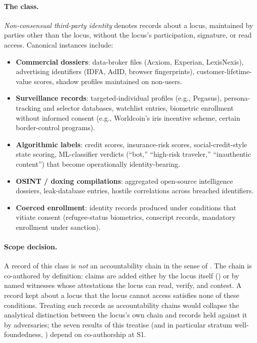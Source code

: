 \documentclass[11pt,a4paper,parskip=half-,DIV=12,headings=standardclasses]{scrartcl}
\theoremstyle{ncthm}
\theoremstyle{ncdef}
\begin{document}
\paragraph{The class.} \emph{Non-consensual third-party identity}
denotes records about a locus, maintained by parties other than the
locus, without the locus's participation, signature, or read access.
Canonical instances include:
\begin{itemize}
\item \textbf{Commercial dossiers}: data-broker files (Acxiom,
  Experian, LexisNexis), advertising identifiers (IDFA, AdID, browser
  fingerprints), customer-lifetime-value scores, shadow profiles
  maintained on non-users.
\item \textbf{Surveillance records}: targeted-individual profiles
  (e.g., Pegasus), persona-tracking and selector databases, watchlist
  entries, biometric enrollment without informed consent (e.g.,
  Worldcoin's iris incentive scheme, certain border-control programs).
\item \textbf{Algorithmic labels}: credit scores, insurance-risk
  scores, social-credit-style state scoring, ML-classifier verdicts
  (``bot,'' ``high-risk traveler,'' ``inauthentic content'') that
  become operationally identity-bearing.
\item \textbf{OSINT / doxing compilations}: aggregated open-source
  intelligence dossiers, leak-database entries, hostile correlations
  across breached identifiers.
\item \textbf{Coerced enrollment}: identity records produced under
  conditions that vitiate consent (refugee-status biometrics,
  conscript records, mandatory enrollment under sanction).
\end{itemize}

\paragraph{Scope decision.} A record of this class is \emph{not} an
accountability chain in the sense of . The
chain is co-authored by definition: claims are added either by the
locus itself () or by named witnesses whose
attestations the locus can read, verify, and contest. A record kept
about a locus that the locus cannot access satisfies none of these
conditions. Treating such records as accountability chains would
collapse the analytical distinction between the locus's own chain and
records held against it by adversaries; the seven results of this
treatise (and in particular stratum well-foundedness,
) depend on co-authorship at S1.
\end{document}
